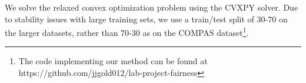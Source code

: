 
We solve the relaxed convex optimization problem using the CVXPY solver. Due to stability issues with large training sets, we use a train/test split of 30-70 on the larger datasets, rather than 70-30 as on the COMPAS dataset\footnote{The code implementing our method can be found at https://github.com/jjgold012/lab-project-fairness}.

%
%
%










